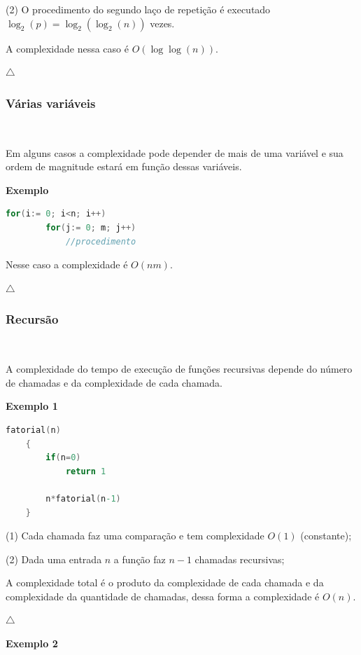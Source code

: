(2) O procedimento do segundo laço de repetição é executado $\log_2(p) = \log_2(\log_2(n))$ vezes.

A complexidade nessa caso é $O(\log\log(n))$.

{\raggedleft $\bigtriangleup$ \par}

\subsubsection{Várias variáveis}
\

Em alguns casos a complexidade pode depender de mais de uma variável e sua ordem de magnitude estará em função dessas variáveis.

\textbf{Exemplo}  

\begin{lstlisting}[language=C, frame=single]
    for(i:= 0; i<n; i++)
        for(j:= 0; m; j++)
            //procedimento
\end{lstlisting}

Nesse caso a complexidade é $O(nm)$.

{\raggedleft $\bigtriangleup$ \par}

\subsubsection{Recursão}
\

A complexidade do tempo de execução de funções recursivas depende do número de chamadas e da complexidade de cada chamada.

\textbf{Exemplo 1} 

\begin{lstlisting}[language=C, frame=single]
    fatorial(n)
    {
        if(n=0)
            return 1

        n*fatorial(n-1)
    }
\end{lstlisting}

(1) Cada chamada faz uma comparação e tem complexidade $O(1)$ (constante);

(2) Dada uma entrada $n$ a função faz $n-1$ chamadas recursivas;

A complexidade total é o produto da complexidade de cada chamada e da complexidade da quantidade de chamadas, dessa forma a complexidade é $O(n)$.


{\raggedleft $\bigtriangleup$ \par}

\textbf{Exemplo 2} 

